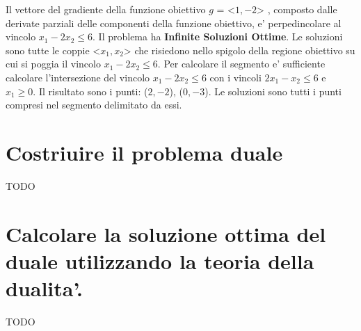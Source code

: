 \documentclass[a4paper,12pt,oneside]{article}
\begin{document}
    Il vettore del gradiente della funzione obiettivo $g$ = <$1, -2$> , composto dalle derivate parziali delle componenti della funzione obiettivo, e' perpedincolare al vincolo $x_1 - 2x_2 \leq 6$.
    Il problema ha \textbf{Infinite Soluzioni Ottime}.
    Le soluzioni sono tutte le coppie <$x_1, x_2$> che risiedono nello spigolo della regione obiettivo su cui si poggia il vincolo $x_1 - 2x_2 \leq 6$.
    Per calcolare il segmento e' sufficiente calcolare l'intersezione del vincolo $x_1 - 2x_2 \leq 6$ con i vincoli $2x_1 - x_2 \leq 6$ e $x_1 \geq 0$.
    Il risultato sono i punti: ($2, -2$),  ($0, -3$). Le soluzioni sono tutti i punti compresi nel segmento delimitato da essi.

    \section{Costriuire il problema duale}
    
    TODO
    
    \section{Calcolare la soluzione ottima del duale utilizzando la teoria della dualita'.}
    
    TODO
\end{document}
